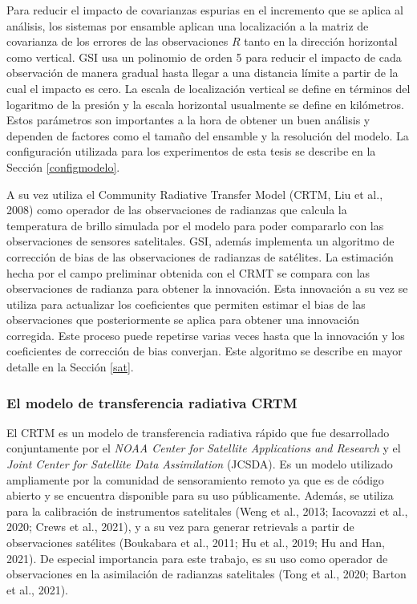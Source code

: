 \documentclass[12pt,oneside,a4paper]{reedthesis}
\begin{document}
Para reducir el impacto de covarianzas espurias en el incremento que se aplica al análisis, los sistemas por ensamble aplican una localización a la matriz de covarianza de los errores de las observaciones \(R\) tanto en la dirección horizontal como vertical.
GSI usa un polinomio de orden 5 para reducir el impacto de cada observación de manera gradual hasta llegar a una distancia límite a partir de la cual el impacto es cero. La escala de localización vertical se define en términos del logaritmo de la presión y la escala horizontal usualmente se define en kilómetros.
Estos parámetros son importantes a la hora de obtener un buen análisis y dependen de factores como el tamaño del ensamble y la resolución del modelo. La configuración utilizada para los experimentos de esta tesis se describe en la Sección \ref{configmodelo}.

A su vez utiliza el Community Radiative Transfer Model (CRTM, Liu et al., 2008) como operador de las observaciones de radianzas que calcula la temperatura de brillo simulada por el modelo para poder compararlo con las observaciones de sensores satelitales.
GSI, además implementa un algoritmo de corrección de bias de las observaciones de radianzas de satélites.
La estimación hecha por el campo preliminar obtenida con el CRMT se compara con las observaciones de radianza para obtener la innovación.
Esta innovación a su vez se utiliza para actualizar los coeficientes que permiten estimar el bias de las observaciones que posteriormente se aplica para obtener una innovación corregida. Este proceso puede repetirse varias veces hasta que la innovación y los coeficientes de corrección de bias converjan.
Este algoritmo se describe en mayor detalle en la Sección \ref{sat}.

\hypertarget{el-modelo-de-transferencia-radiativa-crtm}{%
\subsubsection{El modelo de transferencia radiativa CRTM}\label{el-modelo-de-transferencia-radiativa-crtm}}

El CRTM es un modelo de transferencia radiativa rápido que fue desarrollado conjuntamente por el \emph{NOAA Center for Satellite Applications and Research} y el \emph{Joint Center for Satellite Data Assimilation} (JCSDA). Es un modelo utilizado ampliamente por la comunidad de sensoramiento remoto ya que es de código abierto y se encuentra disponible para su uso públicamente. Además, se utiliza para la calibración de instrumentos satelitales (Weng et al., 2013; Iacovazzi et al., 2020; Crews et al., 2021), y a su vez para generar retrievals a partir de observaciones satélites (Boukabara et al., 2011; Hu et al., 2019; Hu and Han, 2021). De especial importancia para este trabajo, es su uso como operador de observaciones en la asimilación de radianzas satelitales (Tong et al., 2020; Barton et al., 2021).
\end{document}
